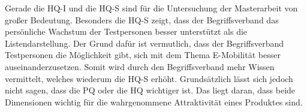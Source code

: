 Gerade die \ac{HQ-I} und die \ac{HQ-S} sind für die Untersuchung der Masterarbeit von großer Bedeutung.
Besonders die \ac{HQ-S} zeigt, dass der Begriffsverband das persönliche Wachstum der Testpersonen besser unterstützt als die Listendarstellung.
Der Grund dafür ist vermutlich, dass der Begriffsverband Testpersonen die Möglichkeit gibt, sich mit dem Thema E-Mobilität besser auseinanderzusetzen.
Somit wird durch den Begriffsverband mehr Wissen vermittelt, welches wiederum die \ac{HQ-S} erhöht.
Grundsätzlich lässt sich jedoch nicht sagen, dass die \ac{PQ} oder die \ac{HQ} wichtiger ist.
Das liegt daran, dass beide Dimensionen wichtig für die wahrgenommene Attraktivität eines Produktes sind. \\
